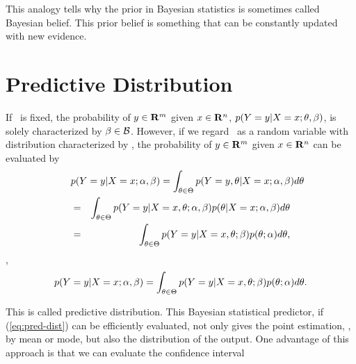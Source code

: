 This analogy tells why the prior in Bayesian statistics
is sometimes called Bayesian belief.
This prior belief is something that can be constantly updated with new evidence.


\section{Predictive Distribution}

If \param\ is fixed,
the probability of $y\in\mathbf{R}^m$ given $x\in\mathbf{R}^n$,
$p(Y=y|X=x; \theta, \beta)$,
is solely characterized by $\beta\in\mathcal{B}$.
However, if we regard \param\ as a random variable with distribution characterized by \prior,
the probability of $y\in\mathbf{R}^m$ given $x\in\mathbf{R}^n$
can be evaluated by
\begin{eqnarray*}
\lefteqn{
p(Y=y|X=x; \prior, \noise)
=
\int_{\param\in\paramset} p(Y=y, \param|X=x; \prior, \noise) d\param
}
\\
&=&
\int_{\param\in\paramset} p(Y=y| X=x,\param; \prior, \noise) p(\param|X=x; \prior, \noise) d\param
\\
&=&
\int_{\param\in\paramset} p(Y=y| X=x,\param; \noise) p(\param; \prior) d\param,
\end{eqnarray*}
\ie,
\begin{equation}
\label{eq:pred-dist}
p(Y=y|X=x; \alpha, \beta) = \int_{\theta\in\Theta} p(Y=y| X=x,\theta; \beta) p(\theta; \alpha) d\theta.
\end{equation}

This is called predictive distribution.
This Bayesian statistical predictor,
if (\ref{eq:pred-dist}) can be efficiently evaluated,
not only gives the point estimation, \eg, by mean or mode,
but also the distribution of the output.
One advantage of this approach is that
we can evaluate the confidence interval

